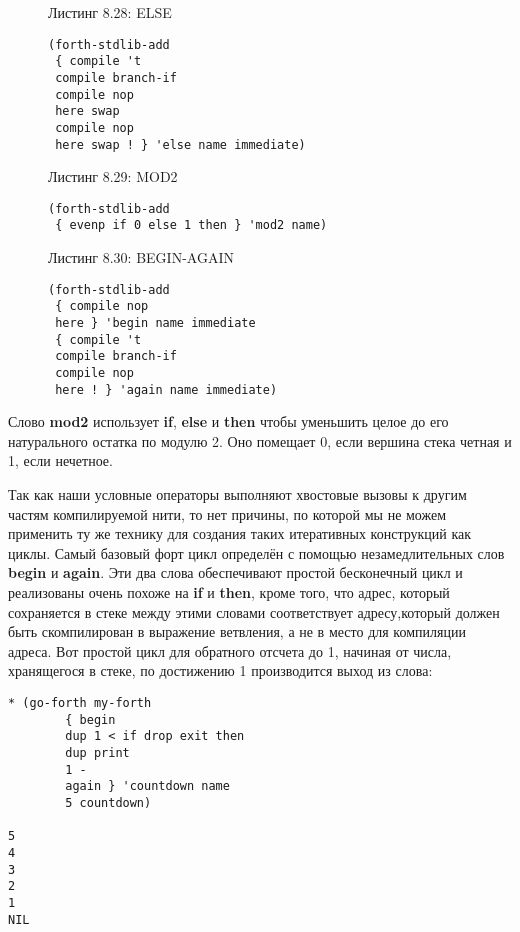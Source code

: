 \begin{figure}Листинг 8.28: ELSE\label{listing_8.28}
\listbegin
\begin{verbatim}
(forth-stdlib-add
 { compile 't
 compile branch-if
 compile nop
 here swap
 compile nop
 here swap ! } 'else name immediate)
\end{verbatim}
\listend
\end{figure}


\begin{figure}Листинг 8.29: MOD2\label{listing_8.29}
\listbegin
\begin{verbatim}
(forth-stdlib-add
 { evenp if 0 else 1 then } 'mod2 name)
\end{verbatim}
\listend
\end{figure}

\begin{figure}Листинг 8.30: BEGIN-AGAIN\label{listing_8.30}
\listbegin
\begin{verbatim}
(forth-stdlib-add
 { compile nop
 here } 'begin name immediate
 { compile 't
 compile branch-if
 compile nop
 here ! } 'again name immediate)
\end{verbatim}
\listend
\end{figure}

Слово \textbf{mod2} использует \textbf{if}, \textbf{else} и \textbf{then} чтобы уменьшить целое до его натурального остатка по модулю 2. Оно помещает 0, если вершина стека четная и 1, если нечетное.

Так как наши условные операторы  выполняют хвостовые вызовы к другим частям компилируемой нити, то нет причины, по которой мы не можем применить ту же технику для создания таких итеративных конструкций как циклы. Самый базовый форт цикл определён с помощью незамедлительных слов \textbf{begin} и \textbf{again}. Эти два слова обеспечивают простой бесконечный цикл и реализованы очень похоже на \textbf{if} и \textbf{then}, кроме того, что адрес, который сохраняется в стеке между этими словами соответствует адресу,который должен быть скомпилирован в выражение ветвления, а не в место для компиляции адреса. Вот простой цикл для обратного отсчета до 1, начиная от числа, хранящегося в стеке, по достижению 1 производится выход из слова:

\begin{verbatim}
* (go-forth my-forth
	    { begin
	    dup 1 < if drop exit then
	    dup print
	    1 -
	    again } 'countdown name
	    5 countdown)

5 
4 
3 
2 
1 
NIL
\end{verbatim}

